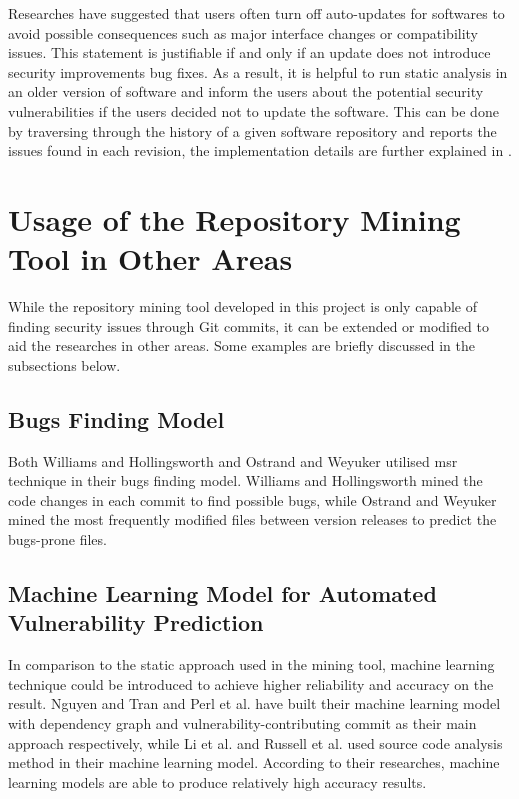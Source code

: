 \documentclass[12pt, a4paper]{report}
\begin{document}
Researches have suggested that users often turn off auto-updates for softwares \cite{fagan_2015,
mathur_2017} to avoid possible consequences such as major interface changes or compatibility issues.
This statement is justifiable if and only if an update does not introduce security improvements bug
fixes. As a result, it is helpful to run static analysis in an older version of software and inform
the users about the potential security vulnerabilities if the users decided not to update the
software. This can be done by traversing through the history of a given software repository and
reports the issues found in each revision, the implementation details are further explained in .

\section{Usage of the Repository Mining Tool in Other Areas}
While the repository mining tool developed in this project is only capable of finding security
issues through Git commits, it can be extended or modified to aid the researches in other areas.
Some examples are briefly discussed in the subsections below.

\subsection{Bugs Finding Model}
Both Williams and Hollingsworth \cite{williams_2005} and Ostrand and Weyuker \cite{ostrand_2004}
utilised \acrshort{msr} technique in their bugs finding model. Williams and Hollingsworth mined the
code changes in each commit to find possible bugs, while Ostrand and Weyuker mined the most
frequently modified files between version releases to predict the bugs-prone files.

\subsection{Machine Learning Model for Automated Vulnerability Prediction}
In comparison to the static approach used in the mining tool, machine learning technique could be
introduced to achieve higher reliability and accuracy on the result. Nguyen and Tran
\cite{nguyen_2010} and Perl et al. \cite{perl_2015} have built their machine learning model with
dependency graph and vulnerability-contributing commit as their main approach respectively, while Li
et al. \cite{li_2016} and Russell et al. \cite{russell_2018} used source code analysis method in
their machine learning model. According to their researches, machine learning models are able to
produce relatively high accuracy results.
\end{document}

